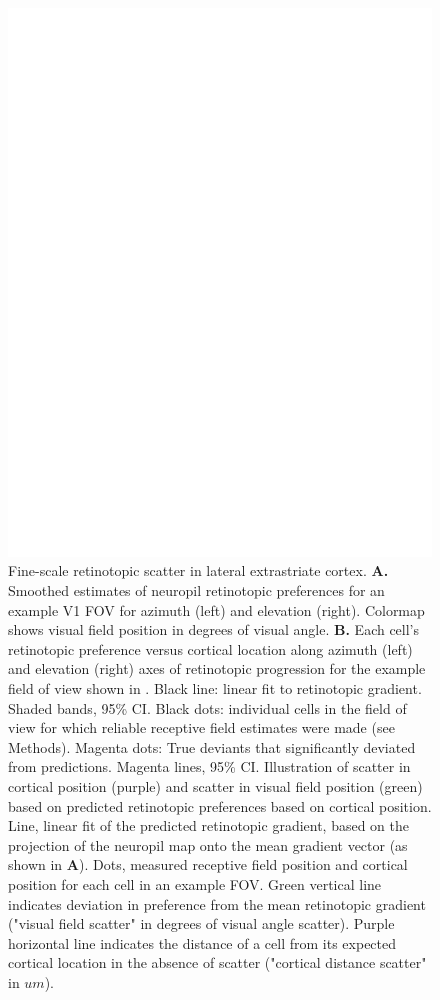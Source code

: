 \begin{figure}[t!]
    \includegraphics[width=\textwidth]{figures/chapter_3/fig_3-3_retino_scatter/fig_3-3_retino_scatter.pdf}
    \vspace{.1in}
    \caption[Fine-scale retinotopic scatter]{Fine-scale retinotopic scatter in lateral extrastriate cortex. 
    \textbf{A.} Smoothed estimates of neuropil retinotopic preferences for an example V1 FOV for azimuth (left) and elevation (right). Colormap shows visual field position in degrees of visual angle.
    \textbf{B.} Each cell's retinotopic preference versus cortical location along azimuth (left) and elevation (right) axes of retinotopic progression for the example field of view shown in . Black line: linear fit to retinotopic gradient. Shaded bands, 95\% CI. Black dots: individual cells in the field of view for which reliable receptive field estimates were made (see Methods). Magenta dots: True deviants that significantly deviated from predictions. Magenta lines, 95\% CI. 
     Illustration of scatter in cortical position (purple) and scatter in visual field position (green) based on predicted retinotopic preferences based on cortical position. Line, linear fit of the predicted retinotopic gradient, based on the projection of the neuropil map onto the mean gradient vector (as shown in \textbf{A}). Dots, measured receptive field position and cortical position for each cell in an example FOV. Green vertical line indicates deviation in preference from the mean retinotopic gradient ("visual field scatter" in degrees of visual angle scatter). Purple horizontal line indicates the distance of a cell from its expected cortical location in the absence of scatter ("cortical distance scatter" in $um$). 
}
\end{figure}

